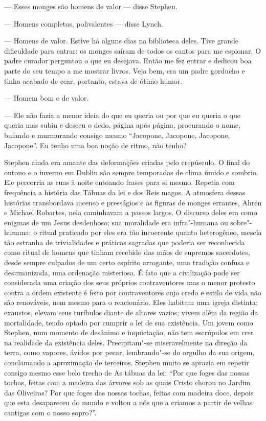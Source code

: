 --- Esses monges são homens de valor --- disse Stephen.

--- Homens completos, polivalentes --- disse Lynch.

--- Homens de valor.  Estive há alguns dias na biblioteca deles.  Tive grande
dificuldade para entrar: os monges saíram de todos os cantos para me espionar.
O padre curador perguntou o que eu desejava.  Então me fez entrar e
dedicou boa parte do seu tempo a me mostrar livros.  Veja bem, era um padre
gorducho e tinha acabado de cear, portanto, estava de ótimo humor.

--- Homem bom e de valor.

--- Ele não fazia a menor ideia do que eu queria ou por que eu queria o que
queria mas subiu e desceu o dedo, página após página, procurando o nome,
bufando e murmurando consigo mesmo “Jacopone, Jacopone, Jacopone, Jacopone”.
Eu tenho uma boa noção de ritmo, não tenho?

Stephen ainda era amante das deformações criadas pelo crepúsculo.  O final do
outono e o inverno em Dublin são sempre temporadas de clima úmido e sombrio.
Ele percorria as ruas à noite entoando frases para si mesmo.  Repetia com
frequência a história das Tábuas da lei e dos Reis magos.  A
atmosfera dessas histórias transbordava incenso e presságios e as figuras de
monges errantes, Ahren e Michael Robartes, nela caminhavam a passos largos.  O
discurso deles era como enigmas de um Jesus desdenhoso; sua moralidade era
infra"-humana ou sobre"-humana: o ritual praticado por eles era tão incoerente
quanto heterogêneo, mescla tão estranha de trivialidades e práticas sagradas
que poderia ser reconhecida como ritual de homens que tinham recebido das mãos
de supremos sacerdotes, desde sempre culpados de um certo espírito arrogante,
uma tradição confusa e desumanizada, uma ordenação misteriosa.  É fato que a
civilização pode ser considerada uma criação dos seus próprios contraventores
mas o menor protesto contra a ordem existente é feito por contraventores cujo
credo e estilo de vida não são renováveis, nem mesmo para o reacionário.  Eles
habitam uma igreja distinta; exaustos, elevam seus turíbulos diante de altares
vazios; vivem além da região da mortalidade, tendo optado por cumprir a lei de
sua existência.  Um jovem como Stephen, num momento de desânimo e inquietação,
não tem escrúpulos em crer na realidade da existência deles.
Precipitam"-se miseravelmente na direção da terra, como vapores, ávidos
por pecar, lembrando"-se do orgulho da sua origem, conclamando a aproximação de
terceiros.  Stephen muito se aprazia em repetir consigo mesmo esse belo trecho
de As tábuas da lei: “Por que foges das nossas tochas, feitas com a
madeira das árvores sob as quais Cristo chorou no Jardim das Oliveiras?  Por
que foges das nossas tochas, feitas com madeira doce, depois que esta
desapareceu do mundo e voltou a nós que a criamos a partir de velhas cantigas
com o nosso sopro?”.

